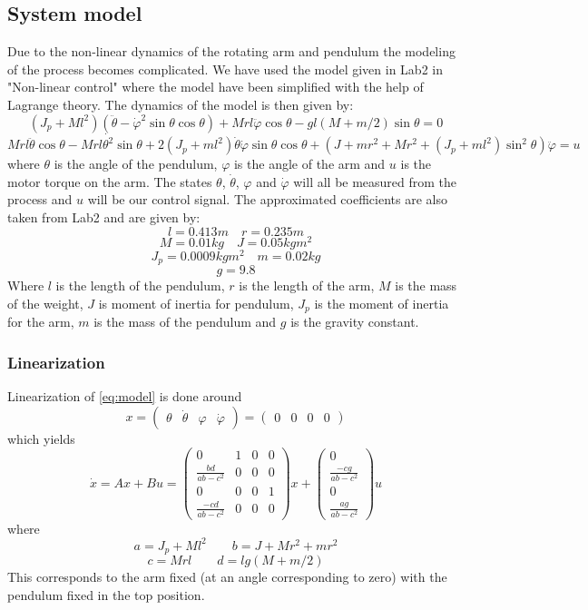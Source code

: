 \documentclass[10pt,a4paper]{article}
\begin{document}



\subsection{System model}
Due to the non-linear dynamics of the rotating arm and pendulum the modeling of the process becomes complicated. We have used the model given in Lab2 in "Non-linear control" where the model have been simplified with the help of Lagrange theory. The dynamics of the model is then given by:
$$(J_p + Ml^2)(\ddot{\theta} - \dot{\varphi} ^2\sin\theta \cos\theta )+Mrl\ddot{\varphi}\cos\theta-gl(M+m/2)\sin\theta = 0 $$
\begin{equation}
Mrl\ddot{\theta}\cos\theta - Mrl\dot{\theta ^2}\sin\theta + 2(J_p + ml^2 ) \dot{\theta} \dot{\varphi}\sin\theta \cos\theta + (J+mr^2 + Mr^2 + (J_p+ml^2)\sin^2\theta)\ddot{\varphi}=u
\label{eq:model}
\end{equation}
where $\theta$ is the angle of the pendulum, $\varphi$ is the angle of the arm and $u$ is the motor torque on the arm. The states $\theta$, $\dot{\theta}$, $\varphi$ and $\dot{\varphi}$ will all be measured from the process and $u$ will be our control signal. The approximated coefficients are also taken from Lab2 and are given by:
$$l=0.413m \quad  r=0.235m$$
$$M=0.01kg \quad J=0.05kgm^2$$
$$J_p=0.0009kgm^2 \quad m=0.02kg$$
$$ g=9.8$$
Where $l$ is the length of the pendulum, $r$ is the length of the arm, $M$ is the mass of the weight, $J$ is moment of inertia  for pendulum, $J_p$ is the moment of inertia for the arm, $m$ is the mass of the pendulum and $g$ is the gravity constant.
\subsubsection{Linearization}
Linearization of \ref{eq:model} is done around
\begin{equation}
x =
\begin{pmatrix}
\theta & \dot\theta & \varphi & \dot\varphi
\end{pmatrix} = 
\begin{pmatrix}
0 & 0 & 0 & 0
\end{pmatrix}
\end{equation}
which yields 
\begin{equation}
\dot{x} = Ax + Bu =
\begin{pmatrix}
0 & 1 & 0  & 0 \\
\frac{bd}{ab-c^2} & 0 & 0 & 0 \\
0 & 0 & 0 & 1 \\
\frac{-cd}{ab-c^2} & 0 & 0 & 0
\end{pmatrix}x
+
\begin{pmatrix}
0 \\
\frac{-cg}{ab-c^2} \\
0 \\
\frac{ag}{ab-c^2}
\end{pmatrix}u
\label{eq:linear}
\end{equation}
where 
$$ a = J_p + M l^2 \qquad b = J + M r^2 + m r^2 $$
$$ c = M r l  \qquad d = l g (M + m/2) $$
This corresponds to the arm fixed (at an angle corresponding to zero) with the pendulum fixed in the top position.
\end{document}
